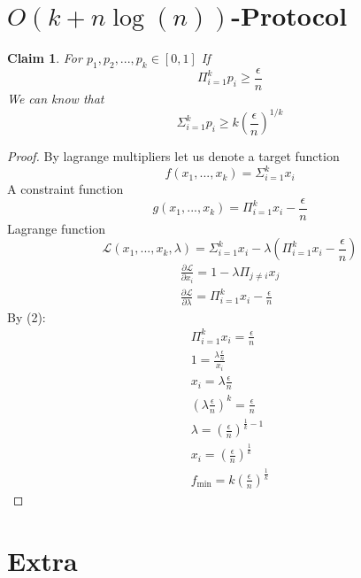 \documentclass{article}
\theoremstyle{plain}
\newtheorem{claim}{Claim}
\begin{document}
\section{$O(k + n\log(n))$-Protocol}
\begin{claim}
For $p_1, p_2, ... , p_k \in [0,1]$ \newline
If
\begin{equation*}
    \Pi_{i=1}^{k}p_i \geq \frac{\epsilon}{n}
\end{equation*}
We can know that
\begin{equation*}
    \Sigma_{i=1}^{k}p_i \geq k\left(\frac{\epsilon}{n}\right)^{1/k}
\end{equation*}
\end{claim}
\begin{proof}
By lagrange multipliers let us denote a target function 
\begin{equation*}
    f(x_1, ... , x_k) = \Sigma_{i=1}^{k}x_i
\end{equation*}
A constraint function
\begin{equation*}
    g(x_1, ... , x_k) = \Pi_{i=1}^{k}x_i - \frac{\epsilon}{n} 
\end{equation*}
Lagrange function
\begin{equation*}
    \mathcal{L}(x_1, ... , x_k, \lambda) = \Sigma_{i=1}^{k}x_i - \lambda\left(\Pi_{i=1}^{k}x_i - \frac{\epsilon}{n}  \right)
\end{equation*}
\begin{align*}
    \frac{\partial\mathcal{L}}{\partial x_i} = 1 - \lambda\Pi_{j \neq i}x_j  \\
    \frac{\partial\mathcal{L}}{\partial \lambda} = \Pi_{i=1}^{k}x_i - \frac{\epsilon}{n}
\end{align*}
By (2):
\begin{align*}
    \Pi_{i=1}^{k}x_i = \frac{\epsilon}{n} \\
    1 = \frac{\lambda\frac{\epsilon}{n}}{x_i} \\ 
    x_i = \lambda\frac{\epsilon}{n} \\
    \left(\lambda\frac{\epsilon}{n}\right)^k = \frac{\epsilon}{n} \\
    \lambda = \left(\frac{\epsilon}{n}\right)^{\frac{1}{k} - 1} \\
    x_i = \left(\frac{\epsilon}{n}\right)^{\frac{1}{k}} \\
    f_{\text{min}} = k\left(\frac{\epsilon}{n}\right)^{\frac{1}{k}}
\end{align*}
\end{proof}
\section{Extra}
\end{document}

